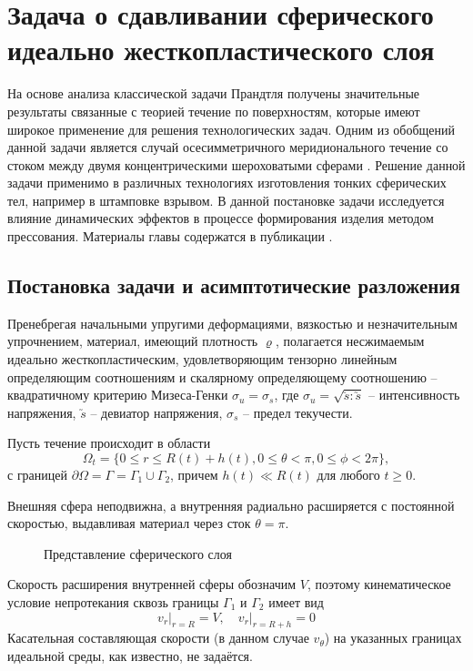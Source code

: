 \chapter{Задача о сдавливании сферического идеально жесткопластического слоя}\label{ch:ch3}
На основе анализа классической задачи Прандтля \autocite{Prandtl:1948} получены значительные результаты связанные с теорией течение по поверхностям, которые имеют широкое применение для решения технологических задач. Одним из обобщений данной задачи является случай осесимметричного меридионального течение со стоком между двумя концентрическими шероховатыми сферами \autocite{Georgievsky:2011}.
Решение данной задачи применимо в различных технологиях изготовления тонких сферических тел, например в штамповке взрывом.
В данной постановке задачи исследуется влияние динамических эффектов в процессе формирования изделия методом прессования. Материалы главы содержатся в публикации \autocite{Shabaykin:2020a}.

\section{Постановка задачи и асимптотические разложения}\label{sec:ch3/sec1}

Пренебрегая начальными упругими деформациями, вязкостью и незначительным упрочнением, материал, имеющий плотность $\varrho$, полагается несжимаемым идеально жесткопластическим, удовлетворяющим тензорно линейным определяющим соотношениям и скалярному определяющему соотношению -- квадратичному критерию Мизеса-Генки $\sigma_{u} = \sigma_{s}$, где $\sigma_{u} = \sqrt{\utilde{s} : \utilde{s}}$ -- интенсивность напряжения, $\utilde{s}$ -- девиатор напряжения, $\sigma_{s}$ -- предел текучести.

Пусть течение происходит в области
\begin{equation}
  \Omega_{t} = \{0 \le r \le R(t)+ h(t), 0 \le \theta < \pi, 0 \le \phi < 2\pi\},
\end{equation}
с границей $\partial\Omega = \Gamma = \Gamma_{1} \cup \Gamma_{2}$, причем $h(t) \ll R(t)$ для любого $t \ge 0$.

Внешняя сфера неподвижна, а внутренняя радиально расширяется с постоянной скоростью, выдавливая материал через сток $\theta=\pi$.

\begin{figure}[ht]
  \caption{Представление сферического слоя}
  \label{fig:ch3/layer/circle}
\end{figure}
Скорость расширения внутренней сферы обозначим $V$, поэтому кинематическое условие непротекания сквозь границы $\Gamma_{1}$ и $\Gamma_{2}$ имеет вид
\begin{equation}
  \label{eq:ch3/sec1/boundary/kinematic}
  v_{r}\lvert_{r=R} = V, \quad v_{r}\lvert_{r=R + h} = 0
\end{equation}
Касательная составляющая скорости (в данном случае $v_{\theta}$) на указанных границах идеальной среды, как известно, не задаётся.

